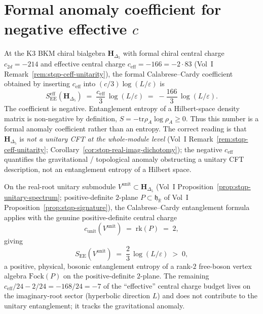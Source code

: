 \section{Formal anomaly coefficient for negative effective
\texorpdfstring{$c$}{c}}
\label{sec:ent-supplement-ii}

\begin{remark}[Negative formal coefficient at $c_{\mathrm{eff}} = -166$;
\ClaimStatusProvedHere]
\label{rem:ent-negative}
At the K3 BKM chiral bialgebra $\mathbf H_{\Delta_5}$ with formal
chiral central charge $c_{2d} = -214$ and effective central charge
$c_{\mathrm{eff}} = -166 = -2\cdot 83$ (Vol~I
Remark~\ref{rem:stqp-ceff-unitarity}), the formal
Calabrese--Cardy coefficient obtained by inserting
$c_{\mathrm{eff}}$ into $(c/3)\log(L/\varepsilon)$ is
\[
S_{\mathrm{EE}}^{\mathrm{eff}}(\mathbf H_{\Delta_5})
\;=\;
\frac{c_{\mathrm{eff}}}{3}\,\log(L/\varepsilon)
\;=\;
-\frac{166}{3}\,\log(L/\varepsilon).
\]
The coefficient is negative. Entanglement entropy of a Hilbert-space
density matrix is non-negative by definition,
$S = -\mathrm{tr}\rho_A\log\rho_A\ge 0$.  Thus this number is a formal
anomaly coefficient rather than an entropy.  The correct reading is that
$\mathbf H_{\Delta_5}$ is \emph{not a unitary CFT at the
whole-module level} (Vol~I
Remark~\ref{rem:stqp-ceff-unitarity};
Corollary~\ref{cor:stqp-real-imag-dichotomy}); the
negative $c_{\mathrm{eff}}$ quantifies the gravitational /
topological anomaly obstructing a unitary CFT description, not
an entanglement entropy of a Hilbert space.
\end{remark}

\begin{proposition}
\label{prop:ent-real-root}
On the real-root unitary submodule
$V^{\mathrm{unit}}\subset\mathbf H_{\Delta_5}$
(Vol~I Proposition~\ref{prop:stqp-unitary-spectrum};
positive-definite $2$-plane $P\subset\mathfrak h_{\mathbb R}$ of
Vol~I Proposition~\ref{prop:stqp-signature}), the
Calabrese--Cardy entanglement formula applies with the genuine
positive-definite central charge
\[
c_{\mathrm{unit}}(V^{\mathrm{unit}})
\;=\;
\mathrm{rk}(P)
\;=\;
2,
\]
giving
\[
S_{\mathrm{EE}}(V^{\mathrm{unit}})
\;=\;
\frac{2}{3}\,\log(L/\varepsilon)
\;>\;0,
\]
a positive, physical, bosonic entanglement entropy of a rank-$2$
free-boson vertex algebra $\mathrm{Fock}(P)$ on the positive-definite
$2$-plane. The remaining $c_{\mathrm{eff}}/24 - 2/24 = -168/24 = -7$
of the ``effective'' central charge budget lives on the
imaginary-root sector (hyperbolic direction $L$) and does not
contribute to the unitary entanglement; it tracks the gravitational
anomaly.
\end{proposition}

